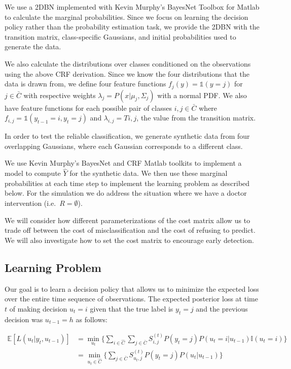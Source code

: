 \documentclass[12pt,solutions]{article}
\newcommand{\I}{\mathbb{I}}
\newcommand{\one}{\mathbb{1}}
\newcommand{\E}{\mathbb{E}}
\begin{document}
We use a 2DBN implemented with Kevin Murphy's BayesNet Toolbox for Matlab to calculate the marginal probabilities. Since we focus on learning the decision policy rather than the probability estimation task, we provide the 2DBN with the transition matrix, class-specific Gaussians, and initial probabilities used to generate the data.

We also calculate the distributions over classes conditioned on the observations using the above CRF derivation. Since we know the four distributions that the data is drawn from, we define four feature functions $f_j(y) = \one(y=j)$ for $j \in \bar{C}$ with respective weights $\lambda_j = P(x | \mu_j, \Sigma_j)$ with a normal PDF.  We also have feature functions for each possible pair of classes $i,j \in \bar{C}$ where  $f_{i,j} = \one(y_{t-1}=i,y_t=j)$ and $\lambda_{i,j} = Ti,j$, the value from the transition matrix.

In order to test the reliable classification, we generate synthetic data from four overlapping Gaussians, where each Gaussian corresponds to a different class.

We use Kevin Murphy's BayesNet and CRF Matlab toolkits to implement a model to compute $\hat{Y}$ for the synthetic data. We then use these marginal probabilities at each time step to implement the learning problem as described below. For the simulation we do address the situation where we have a doctor intervention (i.e.\ $R=\emptyset$). 

We will consider how different parameterizations of the cost matrix allow us to trade off between the cost of misclassification and the cost of refusing to predict. We will also investigate how to set the cost matrix to encourage early detection.

\subsection{Learning Problem}
Our goal is to learn a decision policy that allows us to minimize the expected loss over the entire time sequence of observations.
The expected posterior loss at time $t$ of making decision $u_t=i$ given that the true label is $y_t=j$ and the previous decision was $u_{t-1}=h$ as follows:

\begin{align}
\E[L(u_t|y_t, u_{t-1})] &= \min_{u_t} \Big\{ \sum_{i \in \hat{C}} \sum_{j \in \bar{C}} S_{i,j}^{(t)} P(y_t=j)P(u_t=i|u_{t-1})\I(u_t=i)\Big\}\\
&= \min_{u_t \in \hat{C}} \Big\{ \sum_{j \in \bar{C}} S_{u_t,j}^{(t)} P(y_t=j)P(u_t|u_{t-1})\Big\}
\label{eqn:exploss}
\end{align}
\end{document}

